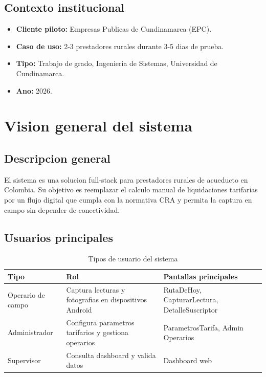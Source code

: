 \documentclass[11pt,a4paper,oneside]{report}
\begin{document}
\section{Contexto institucional}

\begin{itemize}[leftmargin=*]
    \item \textbf{Cliente piloto:} Empresas Publicas de Cundinamarca (EPC).
    \item \textbf{Caso de uso:} 2-3 prestadores rurales durante 3-5 dias de prueba.
    \item \textbf{Tipo:} Trabajo de grado, Ingenieria de Sistemas, Universidad de Cundinamarca.
    \item \textbf{Ano:} 2026.
\end{itemize}


\chapter{Vision general del sistema}

\section{Descripcion general}

El sistema es una solucion full-stack para prestadores rurales de acueducto en Colombia. Su objetivo es reemplazar el calculo manual de liquidaciones tarifarias por un flujo digital que cumpla con la normativa CRA y permita la captura en campo sin depender de conectividad.

\section{Usuarios principales}

\begin{table}[h]
\centering
\caption{Tipos de usuario del sistema}
\begin{tabularx}{\textwidth}{L{3.5cm} L{4.5cm} X}
\toprule
\textbf{Tipo} & \textbf{Rol} & \textbf{Pantallas principales} \\
\midrule
Operario de campo & Captura lecturas y fotografias en dispositivos Android & RutaDeHoy, CapturarLectura, DetalleSuscriptor \\
Administrador & Configura parametros tarifarios y gestiona operarios & ParametrosTarifa, Admin Operarios \\
Supervisor & Consulta dashboard y valida datos & Dashboard web \\
\bottomrule
\end{tabularx}
\end{table}
\end{document}
